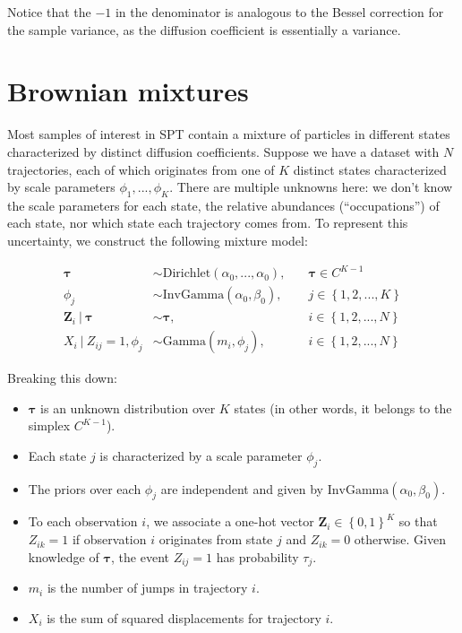 \documentclass{article}
\let\vec\boldsymbol
\begin{document}
Notice that the $-1$ in the denominator is analogous to the Bessel
correction for the sample variance, as the diffusion coefficient is essentially
a variance.

\section{Brownian mixtures}

Most samples of interest in SPT contain a mixture of particles in different
states characterized by distinct diffusion coefficients. Suppose we have a dataset
with $N$ trajectories, each of which originates from one of $K$ distinct states
characterized by scale parameters $\phi_{1}, ..., \phi_{K}$. There are multiple
unknowns here: we don't know the scale parameters for each state, the relative
abundances (``occupations'') of each state, nor which state each trajectory comes
from. To represent this uncertainty, we construct the following mixture model:

\begin{align}\label{eq:brownian_mixture}
    \boldsymbol{\tau} &\sim \text{Dirichlet} \left( \alpha_{0}, ..., \alpha_{0} \right), &\quad \boldsymbol{\tau} \in C^{K-1} \\
    \phi_{j} &\sim \text{InvGamma} \left( \alpha_{0}, \beta_{0} \right), &\quad j \in \left\{ 1, 2, ..., K \right\} \\
    \vec{Z}_{i} \ | \ \boldsymbol{\tau} &\sim \boldsymbol{\tau}, &\quad i \in \left\{ 1, 2, ..., N \right\} \\
    X_{i} \ | \ Z_{ij} = 1, \phi_{j} &\sim \text{Gamma} \left( m_{i}, \phi_{j} \right), &\quad i \in \left\{ 1, 2, ..., N \right\}
\end{align}

Breaking this down:
\begin{itemize}
    \item $\boldsymbol{\tau}$ is an unknown distribution over $K$ states (in other words, it belongs to the simplex $C^{K-1}$).
    \item Each state $j$ is characterized by a scale parameter $\phi_{j}$.
    \item The priors over each $\phi_{j}$ are independent and given by $\text{InvGamma} (\alpha_{0}, \beta_{0})$.
    \item To each observation $i$, we associate a one-hot vector $\vec{Z}_{i} \in \left\{ 0, 1 \right\}^{K}$ so that $Z_{ik} = 1$ if observation $i$ originates from state $j$ and $Z_{ik} = 0$ otherwise. Given knowledge of $\boldsymbol{\tau}$, the event $Z_{ij} = 1$ has probability $\tau_{j}$.
    \item $m_{i}$ is the number of jumps in trajectory $i$.
    \item $X_{i}$ is the sum of squared displacements for trajectory $i$.
\end{itemize}
\end{document}
